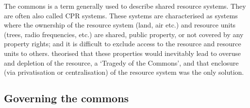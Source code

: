The commons is a term generally used to describe shared resource systems. They are often also called \ac{CPR} systems. These systems are characterised as systems where the ownership of the resource system (land, air etc.) and resource units (trees, radio frequencies, etc.) are shared, public property, or not covered by any property rights; and it is difficult to exclude access to the resource and resource units to others. 
\citet{Hardin1968} theorised that these properties would inevitably lead to overuse and depletion of the resource, a `Tragedy of the Commons', and that enclosure (via privatisation or centralisation) of the resource system was the only solution.

\subsection{Governing the commons}

